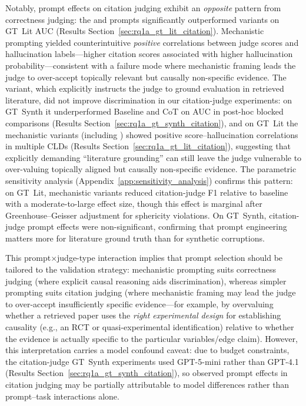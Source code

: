 Notably, prompt effects on citation judging exhibit an \emph{opposite} pattern from correctness judging: the \PromptBaseline{} and \PromptCoT{} prompts significantly outperformed \PromptMechanistic{} variants on GT~Lit AUC (Results Section~\ref{sec:rq1a_gt_lit_citation}). Mechanistic prompting yielded counterintuitive \emph{positive} correlations between judge scores and hallucination labels---higher citation scores associated with higher hallucination probability---consistent with a failure mode where mechanistic framing leads the judge to over-accept topically relevant but causally non-specific evidence. The \PromptMechanisticLit{} variant, which explicitly instructs the judge to ground evaluation in retrieved literature, did not improve discrimination in our citation-judge experiments: on GT~Synth it underperformed Baseline and CoT on AUC in post-hoc blocked comparisons (Results Section~\ref{sec:rq1a_gt_synth_citation}), and on GT~Lit the mechanistic variants (including \PromptMechanisticLit{}) showed positive score--hallucination correlations in multiple CLDs (Results Section~\ref{sec:rq1a_gt_lit_citation}), suggesting that explicitly demanding ``literature grounding'' can still leave the judge vulnerable to over-valuing topically aligned but causally non-specific evidence. The parametric sensitivity analysis (Appendix~\ref{app:sensitivity_analysis}) confirms this pattern: on GT~Lit, mechanistic variants reduced citation-judge F1 relative to baseline with a moderate-to-large effect size, though this effect is marginal after Greenhouse--Geisser adjustment for sphericity violations. On GT~Synth, citation-judge prompt effects were non-significant, confirming that prompt engineering matters more for literature ground truth than for synthetic corruptions.

This prompt$\times$judge-type interaction implies that prompt selection should be tailored to the validation strategy: mechanistic prompting suits correctness judging (where explicit causal reasoning aids discrimination), whereas simpler prompting suits citation judging (where mechanistic framing may lead the judge to over-accept insufficiently specific evidence---for example, by overvaluing whether a retrieved paper uses the \emph{right experimental design} for establishing causality (e.g., an RCT or quasi-experimental identification) relative to whether the evidence is actually specific to the particular variables/edge claim). However, this interpretation carries a model confound caveat: due to budget constraints, the citation-judge GT~Synth experiments used GPT-5-mini rather than GPT-4.1 (Results Section~\ref{sec:rq1a_gt_synth_citation}), so observed prompt effects in citation judging may be partially attributable to model differences rather than prompt--task interactions alone.


